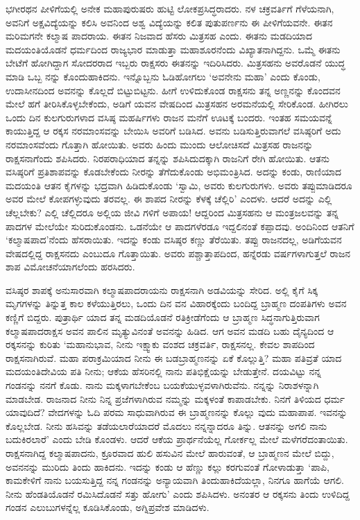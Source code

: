 ಭಗೀರಥನ ಪೀಳಿಗೆಯಲ್ಲಿ ಅನೇಕ ಮಹಾಪುರುಷರು ಹುಟ್ಟಿ ಲೋಕಪ್ರಸಿದ್ಧರಾದರು. ನಳ ಚಕ್ರವರ್ತಿಗೆ ಗೆಳೆಯನಾಗಿ, ಅವನಿಗೆ ಅಕ್ಷವಿದ್ಯೆಯನ್ನು ಕಲಿಸಿ ಅವನಿಂದ ಅಶ್ವ ವಿದ್ಯೆಯನ್ನು ಕಲಿತ ಪುತುಪರ್ಣನು ಈ ಪೀಳಿಗೆಯವನೇ. ಈತನ ಮರಿಮಗನೇ ಕಲ್ಮಾಷ ಪಾದರಾಯ. ಈತನ ನಿಜವಾದ ಹೆಸರು ಮಿತ್ರಸಹ ಎಂದು. ಈತನು ಮಡದಿಯಾದ ಮದಯಂತಿಯೊಡನೆ ಧರ್ಮದಿಂದ ರಾಜ್ಯಭಾರ ಮಾಡುತ್ತಾ ಮಹಾಶೂರನೆಂದು ವಿಖ್ಯಾತನಾಗಿದ್ದನು. ಒಮ್ಮೆ ಈತನು ಬೇಟೆಗೆ ಹೋಗಿದ್ದಾಗ ಸೋದರರಾದ ಇಬ್ಬರು ರಾಕ್ಷಸರು ಈತನನ್ನು ಇದಿರಿಸಿದರು. ಮಿತ್ರಸಹನು ಅವರೊಡನೆ ಯುದ್ಧ ಮಾಡಿ ಒಬ್ಬ ನನ್ನು ಕೊಂದುಹಾಕಿದನು. ಇನ್ನೊಬ್ಬನು ಓಡಿಹೋಗಲು ‘ಅವನೇನು ಮಹಾ’ ಎಂದು ಕೊಂಡು, ಉದಾಸೀನದಿಂದ ಅವನನ್ನು ಕೊಲ್ಲದೆ ಬಿಟ್ಟುಬಿಟ್ಟನು. ಹೀಗೆ ಉಳಿದುಕೊಂಡ ರಾಕ್ಷಸನು ತನ್ನ ಅಣ್ಣನನ್ನು ಕೊಂದವನ ಮೇಲೆ ಹಗೆ ತೀರಿಸಿಕೊಳ್ಳಬೇಕೆಂದು, ಅಡಿಗೆ ಯವನ ವೇಷದಿಂದ ಮಿತ್ರಸಹನ ಅರಮನೆಯಲ್ಲಿ ಸೇರಿಕೊಂಡ. ಹೀಗಿರಲು ಒಂದು ದಿನ ಕುಲಗುರುಗಳಾದ ವಸಿಷ್ಠ ಮಹರ್ಷಿಗಳು ರಾಜನ ಮನೆಗೆ ಊಟಕ್ಕೆ ಬಂದರು. ಇಂತಹ ಸಮಯವನ್ನೆ ಕಾಯುತ್ತಿದ್ದ ಆ ರಕ್ಕಸ ನರಮಾಂಸವನ್ನು ಬೇಯಿಸಿ ಅವರಿಗೆ ಬಡಿಸಿದ. ಅವನು ಬಡಿಸುತ್ತಿರುವಾಗಲೆ ವಸಿಷ್ಠರಿಗೆ ಅದು ನರಮಾಂಸವೆಂದು ಗೊತ್ತಾಗಿ ಹೋಯಿತು. ಅವರು ಹಿಂದು ಮುಂದು ಆಲೋಚಿಸದೆ ಮಿತ್ರಸಹ ರಾಜನನ್ನು ರಾಕ್ಷಸನಾಗೆಂದು ಶಪಿಸಿದರು. ನಿರಪರಾಧಿಯಾದ ತನ್ನನ್ನು ಶಪಿಸಿದುದಕ್ಕಾಗಿ ರಾಜನಿಗೆ ರೇಗಿ ಹೋಯಿತು. ಆತನು ವಸಿಷ್ಠರಿಗೆ ಪ್ರತಿಶಾಪವನ್ನು ಕೊಡಬೇಕೆಂದು ನೀರನ್ನು ತೆಗೆದುಕೊಂಡು ಅಭಿಮಂತ್ರಿಸಿದ. ಅದನ್ನು ಕಂಡು, ರಾಣಿಯಾದ ಮದಯಂತಿ ಆತನ ಕೈಗಳನ್ನು ಭದ್ರವಾಗಿ ಹಿಡಿದುಕೊಂಡು ‘ಸ್ವಾಮಿ, ಅವರು ಕುಲಗುರುಗಳು. ಅವರು ತಪ್ಪುಮಾಡಿದರೂ ಅವರ ಮೇಲೆ ಕೋಪಗಳ್ಳುವುದು ತರವಲ್ಲ. ಈ ಶಾಪದ ನೀರನ್ನು ಕೆಳಕ್ಕೆ ಚೆಲ್ಲಿರಿ’ ಎಂದಳು. ಆದರೆ ಅದನ್ನು ಎಲ್ಲಿ ಚೆಲ್ಲಬೇಕು? ಎಲ್ಲಿ ಚೆಲ್ಲಿದರೂ ಅಲ್ಲಿಯ ಜೀವಿ ಗಳಿಗೆ ಅಪಾಯ! ಆದ್ದರಿಂದ ಮಿತ್ರಸಹನು ಆ ಮಂತ್ರಜಲವನ್ನು ತನ್ನ ಪಾದಗಳ ಮೇಲೆಯೇ ಸುರಿದುಕೊಂಡನು. ಒಡನೆಯೇ ಆ ಪಾದಗಳೆರಡೂ ಇದ್ದಲಿನಂತೆ ಕಪ್ಪಾದವು. ಅಂದಿನಿಂದ ಆತನಿಗೆ ‘ಕಲ್ಮಾಷಪಾದ’ನೆಂದು ಹೆಸರಾಯಿತು. ಇದನ್ನು ಕಂಡು ವಸಿಷ್ಠರ ಕಣ್ಣು ತೆರೆಯಿತು. ತಪ್ಪು ರಾಜನದಲ್ಲ, ಅಡಿಗೆಯವನ ವೇಷದಲ್ಲಿದ್ದ ರಾಕ್ಷಸನದು ಎಂಬುದೂ ಗೊತ್ತಾಯಿತು. ಅವರು ಪಶ್ಚಾತ್ತಾಪದಿಂದ, ಹನ್ನೆರಡು ವರ್ಷಗಳಾಗುತ್ತಲೆ ರಾಜನ ಶಾಪ ವಿಮೋಚನೆಯಾಗಲೆಂದು ಹರಸಿದರು.

ವಸಿಷ್ಠರ ಶಾಪಕ್ಕೆ ಅನುಸಾರವಾಗಿ ಕಲ್ಮಾಷಪಾದರಾಯನು ರಾಕ್ಷಸನಾಗಿ ಅಡವಿಯನ್ನು ಸೇರಿದ. ಅಲ್ಲಿ ಕೈಗೆ ಸಿಕ್ಕ ಮೃಗಗಳನ್ನು ತಿನ್ನುತ್ತ ಕಾಲ ಕಳೆಯುತ್ತಿರಲು, ಒಂದು ದಿನ ವನ ವಿಹಾರಕ್ಕೆಂದು ಬಂದಿದ್ದ ಬ್ರಾಹ್ಮಣ ದಂಪತಿಗಳು ಅವನ ಕಣ್ಣಿಗೆ ಬಿದ್ದರು. ಪುತ್ರಾರ್ಥಿ ಯಾದ ತನ್ನ ಮಡದಿಯೊಡನೆ ರತಿಕ್ರೀಡೆಗೆಂದು ಆ ಬ್ರಾಹ್ಮಣ ಸಿದ್ಧನಾಗುತ್ತಿರುವಾಗ ಕಲ್ಮಾಷಪಾದರಾಕ್ಷಸ ಅವನ ಪಾಲಿನ ಮೃತ್ಯುವಿನಂತೆ ಅವನನ್ನು ಹಿಡಿದ. ಆಗ ಅವನ ಮಡದಿ ಬಹು ದೈನ್ಯದಿಂದ ಆ ರಕ್ಕಸನನ್ನು ಕುರಿತು ‘ಮಹಾನುಭಾವ, ನೀನು ಇಕ್ಷ್ವಾಕು ವಂಶದ ಚಕ್ರವರ್ತಿ, ರಾಕ್ಷಸನಲ್ಲ. ಕೇವಲ ಶಾಪದಿಂದ ರಾಕ್ಷಸನಾಗಿರುವೆ. ಮಹಾ ಪರಾಕ್ರಮಿಯಾದ ನೀನು ಈ ಬಡಬ್ರಾಹ್ಮಣನನ್ನು ಏಕೆ ಕೊಲ್ಲುತ್ತಿ? ಮಹಾ ಪತಿವ್ರತೆ ಯಾದ ಮದಯಂತಿದೇವಿಯ ಪತಿ ನೀನು; ಆಕೆಯ ಹೆಸರಿನಲ್ಲಿ ನಾನು ಪತಿಭಿಕ್ಷೆಯನ್ನು ಬೇಡುತ್ತೇನೆ. ದಯವಿಟ್ಟು ನನ್ನ ಗಂಡನನ್ನು ನನಗೆ ಕೊಡು. ನಾನು ಮಕ್ಕಳಾಗಬೇಕೆಂಬ ಬಯಕೆಯುಳ್ಳವಳಾಗಿರುವೆನು. ನನ್ನನ್ನು ನಿರಾಶಳನ್ನಾಗಿ ಮಾಡಬೇಡ. ರಾಜನಾದ ನೀನು ನಿನ್ನ ಪ್ರಜೆಗಳಾಗಿರುವ ನಮ್ಮನ್ನು ಮಕ್ಕಳಂತೆ ಕಾಪಾಡಬೇಕು. ನಿನಗೆ ತಿಳಿಯದ ಧರ್ಮ ಯಾವುದಿದೆ? ವೇದಗಳನ್ನು ಓದಿ ಪರಮ ಸಾಧುವಾಗಿರುವ ಈ ಬ್ರಾಹ್ಮಣನನ್ನು ಕೊಲ್ಲು ವುದು ಮಹಾಪಾಪ. ಇವನನ್ನು ಕೊಲ್ಲಬೇಡ. ನೀನು ಹಸಿವನ್ನು ತಡೆಯಲಾರೆಯಾದರೆ ಮೊದಲು ನನ್ನನ್ನಾದರೂ ತಿನ್ನು. ಆತನನ್ನು ಅಗಲಿ ನಾನು ಬದುಕಿರಲಾರೆ’ ಎಂದು ಬೇಡಿ ಕೊಂಡಳು. ಆದರೆ ಆಕೆಯ ಪ್ರಾರ್ಥನೆಯೆಲ್ಲ ಗೋರ್ಕಲ್ಲ ಮೇಲೆ ಮಳೆಗರೆದಂತಾಯಿತು. ರಾಕ್ಷಸನಾಗಿದ್ದ ಕಲ್ಮಾಷಪಾದನು, ಕ್ರೂರವಾದ ಹುಲಿ ಹಸುವಿನ ಮೇಲೆ ಹಾರುವಂತೆ, ಆ ಬ್ರಾಹ್ಮಣನ ಮೇಲೆ ಬಿದ್ದು, ಅವನನನ್ನು ಮುರಿದು ತಿಂದು ಹಾಕಿದನು. ಇದನ್ನು ಕಂಡು ಆ ಹೆಣ್ಣು ಕಲ್ಲು ಕರಗುವಂತೆ ಗೋಳಾಡುತ್ತಾ ‘ಪಾಪಿ, ಕಾಮಕೇಳಿಗೆ ನಾನು ಬಯಸುತ್ತಿದ್ದ ನನ್ನ ಗಂಡನನ್ನು ಅನ್ಯಾಯವಾಗಿ ತಿಂದುಹಾಕಿದೆಯಲ್ಲಾ, ನಿನಗೂ ಹಾಗೆಯೆ ಆಗಲಿ. ನೀನು ಹೆಂಡತಿಯೊಡನೆ ರಮಿಸಿದೊಡನೆ ಸತ್ತು ಹೋಗು’ ಎಂದು ಶಪಿಸಿದಳು. ಅನಂತರ ಆ ರಕ್ಕಸನು ತಿಂದು ಉಳಿದಿದ್ದ ಗಂಡನ ಎಲುಬುಗಳನ್ನೆಲ್ಲ ಕೂಡಿಸಿಕೊಂಡು, ಅಗ್ನಿಪ್ರವೇಶ ಮಾಡಿದಳು.


